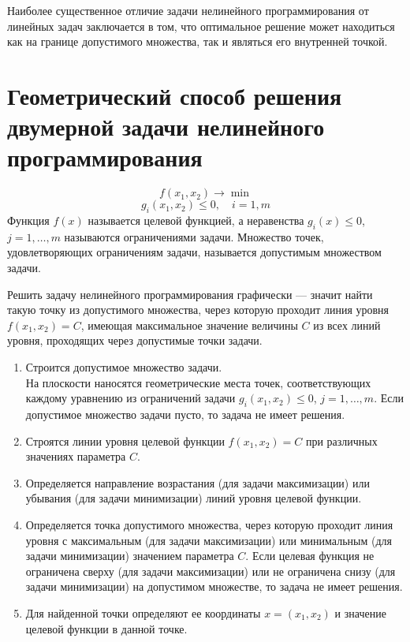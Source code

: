 \documentclass[17pt]{extarticle}
\begin{document}
Наиболее существенное отличие задачи
нелинейного программирования от линейных задач
заключается в том, что оптимальное решение может
находиться как на границе допустимого множества,
так и являться его внутренней точкой.



\section{Геометрический способ решения двумерной задачи нелинейного программирования}
\[
    f(x_1, x_2) \to \min
\]
\[
    g_i(x_1, x_2) \leq 0, \quad i = 1, m
\]
Функция \( f(x) \) называется целевой функцией, а неравенства \( g_i(x) \leq 0 \), \( j = 1, \ldots, m \) называются ограничениями задачи.
Множество точек, удовлетворяющих ограничениям задачи, называется допустимым множеством задачи.

Решить задачу нелинейного программирования графически — значит найти такую точку из допустимого множества,
через которую проходит линия уровня \( f(x_1, x_2) = C \), имеющая максимальное значение величины \( C \) из всех линий уровня,
проходящих через допустимые точки задачи.

\begin{enumerate}
    \item Строится допустимое множество задачи. \\ На плоскости наносятся геометрические места точек,
          соответствующих каждому уравнению из ограничений задачи \( g_i(x_1, x_2) \leq 0 \), \( j = 1, \ldots, m \).
          Если допустимое множество задачи пусто, то задача не имеет решения.

    \item Строятся линии уровня целевой функции \( f(x_1, x_2) = C \) при различных значениях параметра \( C \).

    \item Определяется направление возрастания (для задачи максимизации) или убывания (для задачи минимизации) линий уровня целевой функции.

    \item Определяется точка допустимого множества, через которую проходит линия уровня с максимальным (для задачи максимизации)
          или минимальным (для задачи минимизации) значением параметра \( C \). Если целевая функция не ограничена сверху (для задачи максимизации)
          или не ограничена снизу (для задачи минимизации) на допустимом множестве, то задача не имеет решения.

    \item Для найденной точки определяют ее координаты \( x = (x_1, x_2) \) и значение целевой функции в данной точке.
\end{enumerate}
\end{document}
